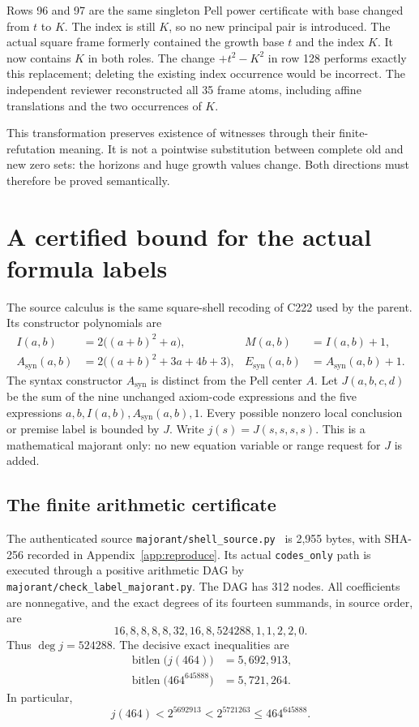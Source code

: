 \documentclass[11pt,a4paper]{article}
\theoremstyle{definition}
\newcommand{\file}[1]{\nolinkurl{#1}}
\newcommand{\bitlen}{\operatorname{bitlen}}
\begin{document}
Rows 96 and 97 are the same singleton Pell power certificate with base
changed from $t$ to $K$. The index is still $K$, so no new principal pair
is introduced. The actual square frame formerly contained the growth
base $t$ and the index $K$. It now contains $K$ in both roles. The change
$+t^2-K^2$ in row 128 performs exactly this replacement; deleting the
existing index occurrence would be incorrect. The independent reviewer
reconstructed all 35 frame atoms, including affine translations and the
two occurrences of $K$.

This transformation preserves existence of witnesses through their
finite-refutation meaning. It is not a pointwise substitution between
complete old and new zero sets: the horizons and huge growth values
change. Both directions must therefore be proved semantically.

\section{A certified bound for the actual formula labels}\label{sec:labels}

The source calculus is the same square-shell recoding of C222 used by
the parent. Its constructor polynomials are
\begin{align*}
 I(a,b)&=2\bigl((a+b)^2+a\bigr),& M(a,b)&=I(a,b)+1,\\
 A_{\mathrm{syn}}(a,b)&=2\bigl((a+b)^2+3a+4b+3\bigr),&
 E_{\mathrm{syn}}(a,b)&=A_{\mathrm{syn}}(a,b)+1.
\end{align*}
The syntax constructor $A_{\mathrm{syn}}$ is distinct from the Pell center
$A$. Let $J(a,b,c,d)$ be the sum of the nine unchanged axiom-code
expressions and the five expressions $a,b,I(a,b),A_{\mathrm{syn}}(a,b),1$.
Every possible nonzero local conclusion or premise label is bounded by
$J$. Write $j(s)=J(s,s,s,s)$. This is a mathematical majorant only: no
new equation variable or range request for $J$ is added.

\subsection{The finite arithmetic certificate}

The authenticated source \file{majorant/shell_source.py}~\cite{shell112} is 2,955 bytes,
with SHA-256 recorded in Appendix~\ref{app:reproduce}. Its actual
\file{codes_only} path is executed through a positive arithmetic DAG by
\file{majorant/check_label_majorant.py}. The DAG has 312 nodes. All
coefficients are nonnegative, and the exact degrees of its fourteen
summands, in source order, are
\[
 16,8,8,8,8,32,16,8,524288,1,1,2,2,0.
\]
Thus $\deg j=524288$. The decisive exact inequalities are
\begin{align}
 \bitlen\bigl(j(464)\bigr)&=5{,}692{,}913,\label{eq:bits1}\\
 \bitlen\bigl(464^{645888}\bigr)&=5{,}721{,}264.\label{eq:bits2}
\end{align}
In particular,
\begin{equation}\label{eq:onepoint}
 j(464)<2^{5692913}<2^{5721263}\le 464^{645888}.
\end{equation}
\end{document}
